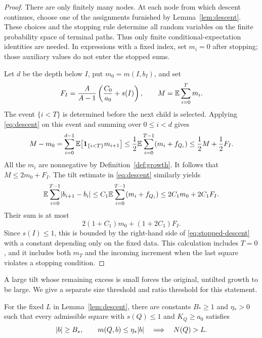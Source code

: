 \begin{proof}
There are only finitely many nodes.  At each node from which descent
continues, choose one of the assignments furnished by
Lemma~\ref{lem:descent}.  These choices and the stopping rule determine
all random variables on the finite probability space of terminal
paths.  Thus only finite conditional-expectation identities are
needed.  In expressions with a fixed index, set \(m_i=0\) after
stopping; those auxiliary values do not enter the stopped sums.

Let \(d\) be the depth below \(I\), put \(m_0=m(I,b_I)\), and set
\[
 F_I=\frac{A}{A-1}\left(\frac{C_0}{a_0}+s(I)\right),
 \qquad
 M=\mathbb E\sum_{i=0}^{T}m_i.
\]
The event \(\{i<T\}\) is determined before the next child is selected.
Applying \eqref{eq:descent} on this event and summing over
\(0\le i<d\) gives
\[
 M-m_0
 =\sum_{i=0}^{d-1}\mathbb E\bigl[\mathbf 1_{\{i<T\}}m_{i+1}\bigr]
 \le \frac12\mathbb E\sum_{i=0}^{T-1}(m_i+f_{Q_i})
 \le \frac12 M+\frac12 F_I.
\]
All the \(m_i\) are nonnegative by Definition~\ref{def:growth}.
It follows that \(M\le 2m_0+F_I\).
The tilt estimate in \eqref{eq:descent} similarly yields
\[
 \mathbb E\sum_{i=0}^{T-1}\lvert b_{i+1}-b_i\rvert
 \le C_1\mathbb E\sum_{i=0}^{T-1}(m_i+f_{Q_i})
 \le 2C_1m_0+2C_1F_I.
\]
Their sum is at most
\[
 2(1+C_1)m_0+(1+2C_1)F_I.
\]
Since \(s(I)\le1\), this is bounded by the right-hand side of
\eqref{eq:stopped-descent} with a constant depending only on the fixed
data.  This calculation includes \(T=0\), and it includes both \(m_T\)
and the incoming increment when the last square violates a stopping
condition.
\end{proof}

A large tilt whose remaining excess is small forces the original,
untilted growth to be large.  We give a separate size threshold and
ratio threshold for this statement.

\begin{lemma}\label{lem:large-slope}
For the fixed \(L\) in Lemma~\ref{lem:descent}, there are constants
\(B_*\ge1\) and \(\eta_*>0\) such that every admissible square with
\(s(Q)\le1\) and \(K_Q\ge a_0\) satisfies
\begin{equation}\label{eq:large-slope}
 \lvert b\rvert\ge B_*,
 \qquad m(Q,b)\le\eta_*\lvert b\rvert
 \quad\Longrightarrow\quad N(Q)>L.
\end{equation}
\end{lemma}

